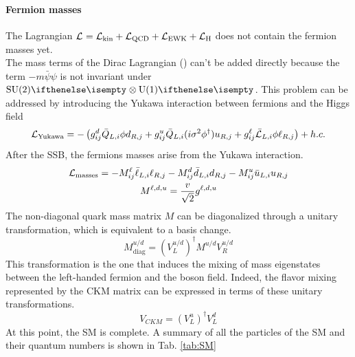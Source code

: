\paragraph*{Fermion masses}
The Lagrangian $\mathcal{L}_\text{}=\mathcal{L}_\text{kin}+\mathcal{L}_\text{QCD}+\mathcal{L}_\text{EWK}+\mathcal{L}_\text{H}$ does not contain the fermion masses yet.\\
The mass terms of the Dirac Lagrangian () can't be added directly because the term \(-m \bar{\psi} \psi\) is not invariant under $\SU{2}\otimes \U{1}$.
This problem can be addressed by introducing the Yukawa interaction between fermions and the Higgs field
\begin{equation}
    \mathcal{L}_\text{Yukawa}=-\left(g_{i j}^{d}\bar{Q}_{L,i}\phi d_{R,j}+g_{i j}^{u}\bar{Q}_{L,i}(i\sigma^{2}\phi^{\dagger})u_{R,j}+g_{i j}^{\ell}\bar{\mathcal{L}}_{L,i}\phi\ell_{R,j}\right)+h.c.
\end{equation}
After the SSB, the fermions masses arise from the Yukawa interaction.
\begin{gather}
    \mathcal{L}_\text{masses}=-M_{i j}^{\ell}\bar{\ell}_{L,i}\ell_{R,j}-M_{i j}^{d}\bar{d}_{L,i}d_{R,j}-M_{i j}^{u}\bar{u}_{L,i}u_{R,j}\\
    M^{\ell,d,u}=\frac{v}{\sqrt{2}}g^{\ell,d,u}
\end{gather}
The non-diagonal quark mass matrix $M$ can be diagonalized through a unitary transformation, which is equivalent to a basis change.
\begin{equation}
    M_{\text{diag}}^{u/d}=(V_L^{u/d})^\dagger M^{u/d} V_R^{u/d}
\end{equation}
This transformation is the one that induces the mixing of mass eigenstates between the left-handed fermion and the \PW boson field.
Indeed, the flavor mixing represented by the CKM matrix can be expressed in terms of these unitary transformations.
\begin{equation}
    V_{CKM}=(V_L^u)^\dagger V_L^d
\end{equation}
At this point, the SM is complete. A summary of all the particles of the SM and their quantum numbers is shown in Tab. \ref{tab:SM}
\\
\\


